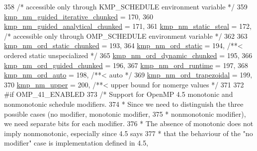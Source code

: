 \begin{DoxyCode}
358     \textcolor{comment}{/* accessible only through KMP\_SCHEDULE environment variable */}
359     \hyperlink{group__WORK__SHARING_ggadcaf200537aaa0218a60c398438f81bead5b1b50dd54b9388d693df0b7e686e44}{kmp\_nm\_guided\_iterative\_chunked}   = 170,
360     \hyperlink{group__WORK__SHARING_ggadcaf200537aaa0218a60c398438f81bea925014ad4e29f25508ff925365264ed9}{kmp\_nm\_guided\_analytical\_chunked}  = 171,
361     \hyperlink{group__WORK__SHARING_ggadcaf200537aaa0218a60c398438f81bea316c24a737661375965565b525fb24c7}{kmp\_nm\_static\_steal}               = 172,  \textcolor{comment}{/* accessible only through OMP\_SCHEDULE
       environment variable */}
362 
363     \hyperlink{group__WORK__SHARING_ggadcaf200537aaa0218a60c398438f81beae8cdb8bf4b85874c34f18511c1681971}{kmp\_nm\_ord\_static\_chunked}         = 193,
364     \hyperlink{group__WORK__SHARING_ggadcaf200537aaa0218a60c398438f81bea3dd2ff18afe8c14f3076694e52942ee5}{kmp\_nm\_ord\_static}                 = 194,  \textcolor{comment}{/**< ordered static unspecialized */}
365     \hyperlink{group__WORK__SHARING_ggadcaf200537aaa0218a60c398438f81bea220b9bf49897b3384ee729c0d15f14a9}{kmp\_nm\_ord\_dynamic\_chunked}        = 195,
366     \hyperlink{group__WORK__SHARING_ggadcaf200537aaa0218a60c398438f81beaf716ff0196dc46e488523339ad8b173c}{kmp\_nm\_ord\_guided\_chunked}         = 196,
367     \hyperlink{group__WORK__SHARING_ggadcaf200537aaa0218a60c398438f81beaaa896a718a72c9682ab38a4e83de49d8}{kmp\_nm\_ord\_runtime}                = 197,
368     \hyperlink{group__WORK__SHARING_ggadcaf200537aaa0218a60c398438f81bea1fd38bd33c374db6667332f011a980d9}{kmp\_nm\_ord\_auto}                   = 198,  \textcolor{comment}{/**< auto */}
369     \hyperlink{group__WORK__SHARING_ggadcaf200537aaa0218a60c398438f81bea886c12d3104f4096b6ddf1540b343acc}{kmp\_nm\_ord\_trapezoidal}            = 199,
370     \hyperlink{group__WORK__SHARING_ggadcaf200537aaa0218a60c398438f81bea9a30ec9215efb0a584597aeda2c03e19}{kmp\_nm\_upper}                      = 200,  \textcolor{comment}{/**< upper bound for nomerge values */}
371 
372 #\textcolor{keywordflow}{if} OMP\_41\_ENABLED
373     \textcolor{comment}{/* Support for OpenMP 4.5 monotonic and nonmonotonic schedule modifiers.}
374 \textcolor{comment}{     * Since we need to distinguish the three possible cases (no modifier, monotonic modifier,}
375 \textcolor{comment}{     * nonmonotonic modifier), we need separate bits for each modifier.}
376 \textcolor{comment}{     * The absence of monotonic does not imply nonmonotonic, especially since 4.5 says}
377 \textcolor{comment}{     * that the behaviour of the "no modifier" case is implementation defined in 4.5,}

\end{DoxyCode}
